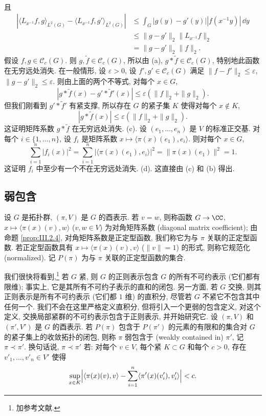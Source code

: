 \begin{solution}
\begin{align*}
\end{align*}
且
\begin{align*}
|\langle L_{x^{-1}}f, g \rangle_{L^2(G)} - \langle L_{x^{-1}}f, g' \rangle_{L^2(G)}| &\leq \int_G |g(y) - g'(y)||f(x^{-1}y)|\,\dd y \\
&\leq \|g - g'\|_2\|L_{x^{-1}}f\|_2 \\
&= \|g - g'\|_2\|f\|_2.
\end{align*}
假设 $f, g \in \mathcal{C}_c(G)$. 则 $g, \tilde{f} \in \mathcal{C}_c(G)$, 所以由 (a), $g * \tilde{f} \in \mathcal{C}_c(G)$, 特别地此函数在无穷远处消失.
在一般情形, 设 $\varepsilon > 0$, 设 $f', g' \in \mathcal{C}_c(G)$ 满足 $\|f - f'\|_2 \leq \varepsilon$, $\|g - g'\|_2 \leq \varepsilon$. 则由上面的两个不等式, 对每个 $x \in G$,
\[
|g * \tilde{f}(x) - g' * \tilde{f}'(x)| \leq \varepsilon(\|f\|_2 + \|g\|_2).
\]
但我们刚看到 $g' * \tilde{f}'$ 有紧支撑, 所以存在 $G$ 的紧子集 $K$ 使得对每个 $x \notin K$,
\[
|g * \tilde{f}(x)| \leq \varepsilon(\|f\|_2 + \|g\|_2).
\]
这证明矩阵系数 $g * \tilde{f}$ 在无穷远处消失.
(c). 设 $(e_1, \ldots, e_n)$ 是 $V$ 的标准正交基. 对每个 $i \in \{1, \ldots, n\}$, 设 $f_i$ 是矩阵系数 $x \longmapsto \langle \pi(x)(e_1), e_i \rangle$. 则对每个 $x \in G$,
\[
\sum_{i=1}^n|f_i(x)|^2 = \sum_{i=1}^n|\langle \pi(x)(e_1), e_i \rangle|^2 = \|\pi(x)(e_1)\|^2 = 1.
\]
这证明 $f_i$ 中至少有一个不在无穷远处消失.
(d). 这直接由 (c) 和 (b) 得出.
\end{solution}

\subsection{弱包含}

设 $G$ 是拓扑群, $(\pi, V)$ 是 $G$ 的酉表示. 若 $v = w$, 则称函数 $G \to \CC$, $x \longmapsto \langle \pi(x)(v), w \rangle$ ($v, w \in V$) 为对角矩阵系数 (diagonal matrix coefficient); 由命题 \ref{prop:III.2.4}, 对角矩阵系数是正定型函数, 我们称它为与 $\pi$ 关联的正定型函数. 若正定型函数具有 $x \longmapsto \langle \pi(x)(v), v \rangle$ ($\|v\| = 1$) 的形式, 则称它规范化 (normalized). 记 $P(\pi)$ 为与 $\pi$ 关联的正定型函数的集合.

我们很快将看到,\footnote{加参考文献.} 若 $G$ 紧, 则 $G$ 的正则表示包含 $G$ 的所有不可约表示 (它们都有限维); 事实上, 它是其所有不可约子表示的直和的闭包. 另一方面, 若 $G$ 交换, 则其正则表示是所有不可约表示 (它们都 $1$ 维) 的直积分, 尽管若 $G$ 不紧它不包含其中任何一个. 我们不会在这里严格定义直积分, 但将引入一个更弱的包含定义, 对这个定义, 交换局部紧群的不可约表示包含于正则表示, 并开始研究它.
设 $(\pi, V)$ 和 $(\pi', V')$ 是 $G$ 的酉表示. 若 $P(\pi)$ 包含于 $P(\pi')$ 的元素的有限和的集合对 $G$ 的紧子集上的收敛拓扑的闭包, 则称 $\pi$ 弱包含于 (weakly contained in) $\pi'$, 记 $\pi \prec \pi'$. 换句话说, $\pi \prec \pi'$ 若: 对每个 $v \in V$, 每个紧 $K \subset G$ 和每个 $c > 0$, 存在 $v'_1, \ldots, v'_n \in V'$ 使得
\[
\sup_{x \in K}\Bigl|\langle \pi(x)(v), v \rangle - \sum_{i=1}^n\langle \pi'(x)(v'_i), v'_i \rangle\Bigr| < c.
\]

